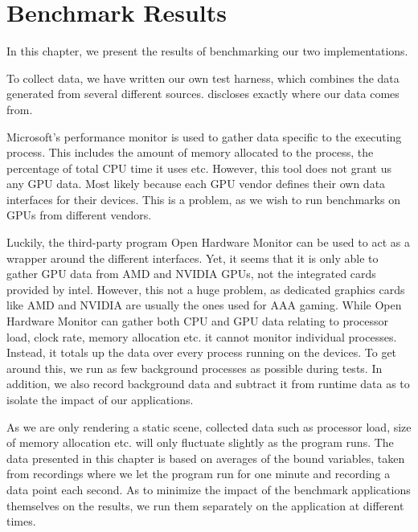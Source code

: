\chapter{Benchmark Results}\label{ch:test_results}
\begin{chaptermeta}
In this chapter, we present the results of benchmarking our two implementations.
\end{chaptermeta}

To collect data, we have written our own test harness, which combines the data generated from several different sources.
 discloses exactly where our data comes from.


Microsoft’s performance monitor is used to gather data specific to the executing process.
This includes the amount of memory allocated to the process, the percentage of total \gls{CPU} time it uses etc.
However, this tool does not grant us any \gls{GPU} data.
Most likely because each \gls{GPU} vendor defines their own data interfaces for their devices.
This is a problem, as we wish to run benchmarks on \glspl{GPU} from different vendors.


Luckily, the third-party program Open Hardware Monitor can be used to act as a wrapper around the different interfaces.
Yet, it seems that it is only able to gather \gls{GPU} data from AMD and NVIDIA \glspl{GPU}, not the integrated cards provided by intel.
However, this not a huge problem, as dedicated graphics cards like AMD and NVIDIA are usually the ones used for AAA gaming. 
While Open Hardware Monitor can gather both \gls{CPU} and \gls{GPU} data relating to processor load, clock rate, memory allocation etc. it cannot monitor individual processes.
Instead, it totals up the data over every process running on the devices. To get around this, we run as few background processes as possible during tests.
In addition, we also record background data and subtract it from runtime data as to isolate the impact of our applications. 


As we are only rendering a static scene, collected data such as processor load, size of memory allocation etc. will only fluctuate slightly as the program runs.
The data presented in this chapter is based on averages of the bound variables, taken from recordings where we let the program run for one minute and recording a data point each second. 
As to minimize the impact of the benchmark applications themselves on the results, we run them separately on the application at different times.


